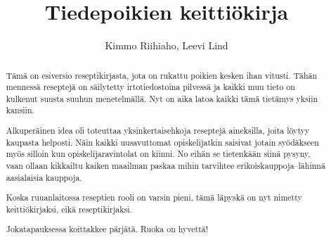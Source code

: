 \documentclass[%
a4paper,
11pt,
draft
]{article}
\begin{document}
\title{Tiedepoikien keittiökirja}
\author{Kimmo Riihiaho, Leevi Lind}
\maketitle

\renewcommand{\abstractname}{Alkusanastelut}
\begin{abstract}
    \noindent 
	Tämä on esiversio reseptikirjasta, jota on rukattu poikien kesken ihan vitusti. 
	Tähän mennessä reseptejä on säilytetty irtotiedostoina pilvessä ja kaikki muu tieto on kulkenut 
	suusta suuhun menetelmällä. Nyt on aika latoa kaikki tämä tietämys yksiin kansiin. 
	
	Alkuperäinen idea oli toteuttaa yksinkertaisehkoja 
    reseptejä aineksilla, joita löytyy kaupasta helposti. Näin kaikki uusavuttomat opiskelijatkin saisivat 
    jotain syödäkseen myös silloin kun opiskelijaravintolat on kiinni. No eihän se tietenkään siinä pysyny, vaan 
    ollaan kikkailtu kaiken maailman paskaa mihin tarvihtee erikoiskauppoja--lähinnä aasialaisia 
    kauppoja.
    
    Koska ruuanlaitossa reseptien rooli on varsin pieni, tämä läpyskä on nyt nimetty keittiökirjaksi, eikä 
    reseptikirjaksi. 
    
    Jokatapauksessa koittakkee pärjätä. Ruoka on hyvettä!
\end{abstract}

\newpage
\tableofcontents

\newpage


\newpage


\newpage


\newpage


\newpage

\end{document}
